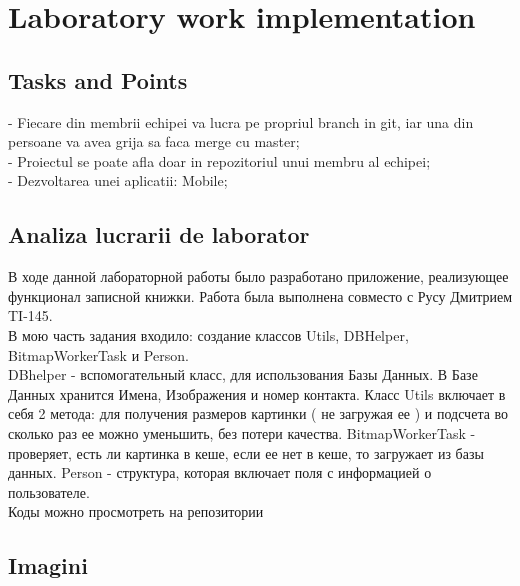 \section{Laboratory work implementation}

\subsection{Tasks and Points}

- Fiecare din membrii echipei va lucra pe propriul branch in git, iar una din persoane va avea grija sa faca merge cu master; \\
\indent 
- Proiectul se poate afla doar in repozitoriul unui membru al echipei; \\
\indent 
- Dezvoltarea unei aplicatii: Mobile;

\subsection{Analiza lucrarii de laborator}
В ходе данной лабораторной работы было разработано приложение, реализующее функционал записной книжки. Работа была выполнена совместо с Русу Дмитрием TI-145.\\
\indent 
В мою часть задания входило: создание классов Utils, DBHelper, BitmapWorkerTask и Person.\\
\indent 
DBhelper - вспомогательный класс, для использования Базы Данных. В Базе Данных хранится Имена, Изображения и номер контакта. Класс Utils включает в себя 2 метода: для получения размеров картинки ( не загружая ее ) и подсчета во сколько раз ее можно уменьшить, без потери качества. BitmapWorkerTask - проверяет, есть ли картинка в кеше, если ее нет в кеше, то загружает из базы данных. Person - структура, которая включает поля с информацией о пользователе.\\
\indent 
Коды можно просмотреть на репозитории 



\subsection{Imagini}

